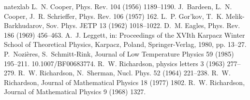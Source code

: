 \documentclass[3p,twocolumn]{elsarticle}
\begin{document}
\begin{thebibliography}{18}
\expandafter\ifx\csname natexlab\endcsname\relax\def\natexlab#1{#1}\fi
\providecommand{\bibinfo}[2]{#2}
\ifx\xfnm\relax \def\xfnm[#1]{\unskip,\space#1}\fi
\bibinfo{author}{L.~N. Cooper}, \bibinfo{journal}{Phys. Rev.}
  \bibinfo{volume}{104} (\bibinfo{year}{1956}) \bibinfo{pages}{1189--1190}.
\bibinfo{author}{J.~Bardeen}, \bibinfo{author}{L.~N. Cooper},
  \bibinfo{author}{J.~R. Schrieffer}, \bibinfo{journal}{Phys. Rev.}
  \bibinfo{volume}{106} (\bibinfo{year}{1957}) \bibinfo{pages}{162}.
\bibinfo{author}{L.~P. {Gor'kov}}, \bibinfo{author}{T.~K. Melik-Barkhudarov},
  \bibinfo{journal}{Sov. Phys. JETP} \bibinfo{volume}{13}
  (\bibinfo{year}{1962}) \bibinfo{pages}{1018--1022}.
\bibinfo{author}{D.~M. Eagles}, \bibinfo{journal}{Phys. Rev.}
  \bibinfo{volume}{186} (\bibinfo{year}{1969}) \bibinfo{pages}{456--463}.
\bibinfo{author}{A.~J. Leggett}, in: \bibinfo{booktitle}{Proceedings of the
  XVIth Karpacz Winter School of Theoretical Physics, Karpacz, Poland},
  \bibinfo{publisher}{Springer-Verlag}, \bibinfo{year}{1980}, pp.
  \bibinfo{pages}{13--27}.
\bibinfo{author}{P.~Nozi\`{e}res}, \bibinfo{author}{S.~Schmitt-Rink},
  \bibinfo{journal}{Journal of Low Temperature Physics} \bibinfo{volume}{59}
  (\bibinfo{year}{1985}) \bibinfo{pages}{195--211}.
  \bibinfo{note}{10.1007/BF00683774}.
\bibinfo{author}{R.~W. Richardson}, \bibinfo{journal}{physics letters}
  \bibinfo{volume}{3} (\bibinfo{year}{1963}) \bibinfo{pages}{277--279}.
\bibinfo{author}{R.~W. Richardson}, \bibinfo{author}{N.~Sherman},
  \bibinfo{journal}{Nucl. Phys.} \bibinfo{volume}{52} (\bibinfo{year}{1964})
  \bibinfo{pages}{221--238}.
\bibinfo{author}{R.~W. Richardson}, \bibinfo{journal}{Journal of Mathematical
  Physics} \bibinfo{volume}{18} (\bibinfo{year}{1977}) \bibinfo{pages}{1802}.
\bibinfo{author}{R.~W. Richardson}, \bibinfo{journal}{Journal of Mathematical
  Physics} \bibinfo{volume}{9} (\bibinfo{year}{1968}) \bibinfo{pages}{1327}.

\end{thebibliography}
\end{document}
